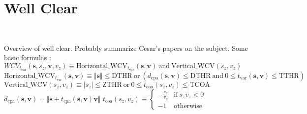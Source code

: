 \section{Well Clear}~\label{sec:wellclear}  

Overview of well clear. Probably summarize Cesar's papers on the subject.
Some basic formulas : \newline
$WCV_{t_{\mathrm{var}}} (\mathbf s,s_z,\mathbf v,v_z) \equiv \mathrm{Horizontal\_WCV_\mathit{t_{\mathrm{var}}}}(\mathbf{s},\mathbf v) ~\mathrm{and}~ \mathrm{Vertical\_WCV}(s_z,v_z)$ \newline
$\mathrm{Horizontal\_WCV_\mathit{t_{\mathrm{var}}}}(\mathbf{s},\mathbf v) \equiv \Vert \mathbf s \Vert \leq \mathrm{DTHR} ~ \mathrm{or} ~ 
(d_{\mathrm{cpa}}(\mathbf s, \mathbf v)  \leq \mathrm{DTHR} ~ \mathrm{and} ~ 0 \leq t_{\mathrm{var}}(\mathbf s, \mathbf v) \leq \mathrm{TTHR})$\newline
$\mathrm{Vertical\_WCV}(s_z,v_z) \equiv \vert s_z \vert \leq \mathrm{ZTHR} ~\mathrm{or}~ 0 \leq t_{\mathrm{coa}}(s_z,v_z) \leq \mathrm{TCOA}$\newline
$d_{\mathrm{cpa}} (\mathbf s, \mathbf v) = \Vert \mathbf s + t_{\mathrm{cpa}}(\mathbf s, \mathbf v) \mathbf v \Vert$ \newline
$t_{\mathrm{coa}}(s_z,v_z) \equiv \left\{
\begin{array}{ll}
- \frac{s_z}{v_z} & \mathrm{if} ~ {s_z}{v_z} < 0\\
- 1  & \mathrm{otherwise}
\end{array}
\right. $ \newline 
\newline 

